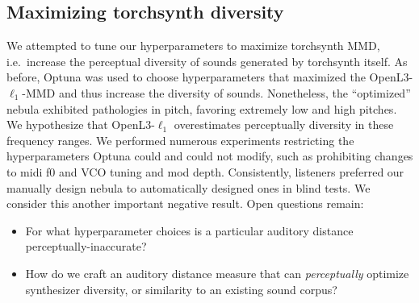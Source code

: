 \subsection{Maximizing torchsynth diversity}
\label{sec:diversity}

We attempted to tune our hyperparameters to maximize torchsynth MMD, i.e.\ increase the perceptual diversity of sounds generated by torchsynth itself. As before, Optuna was used to choose hyperparameters that maximized the OpenL3-$\ell_1$-MMD and thus increase the diversity of sounds. Nonetheless, the ``optimized'' nebula exhibited pathologies in pitch, favoring extremely low and high pitches. We hypothesize that OpenL3-$\ell_1$ overestimates perceptually diversity in these frequency ranges. We performed numerous experiments restricting the hyperparameters Optuna could and could not modify, such as prohibiting changes to midi f0 and VCO tuning and mod depth. Consistently, listeners preferred our manually design nebula to automatically designed ones in blind tests. We consider this another important negative result. Open questions remain:
\begin{itemize}
    \item For what hyperparameter choices is a particular auditory distance perceptually-inaccurate?
    \item How do we craft an auditory distance measure that can {\em perceptually} optimize synthesizer diversity, or similarity to an existing sound corpus?
\end{itemize} 

